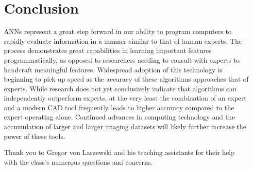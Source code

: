\documentclass[sigconf]{acmart}
\begin{document}
\section{Conclusion}

ANNs represent a great step forward in our ability to program computers to rapidly evaluate information in a manner similar to that of human experts. The process demonstrates great capabilities in learning important features programmatically, as opposed to researchers needing to consult with experts to handcraft meaningful features. Widespread adoption of this technology is beginning to pick up speed as the accuracy of these algorithms approaches that of experts. While research does not yet conclusively indicate that algorithms can independently outperform experts, at the very least the combination of an expert and a modern CAD tool frequently leads to higher accuracy compared to the expert operating alone. Continued advances in computing technology and the accumulation of larger and larger imaging datasets will likely further increase the power of these tools.

\begin{acks}

Thank you to Gregor von Laszewski and his teaching assistants for their help with the class's numerous questions and concerns.
  
\end{acks}


 

\appendix
 

\end{document}
